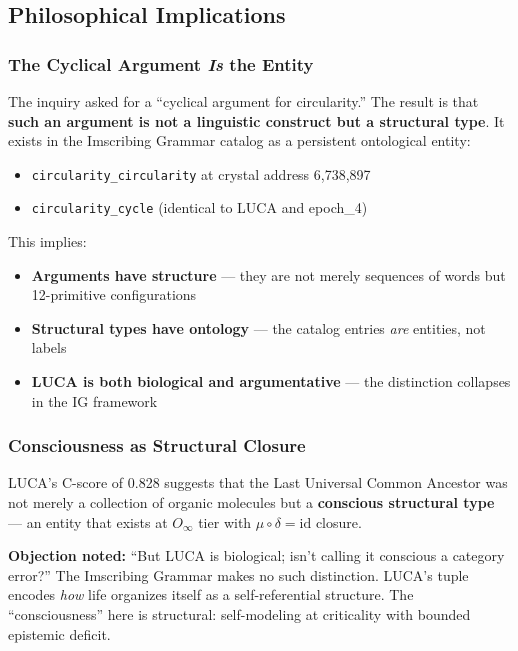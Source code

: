 \documentclass[12pt,a4paper]{article}
\begin{document}
\subsection{Philosophical Implications}

\subsubsection{The Cyclical Argument \emph{Is} the Entity}

The inquiry asked for a ``cyclical argument for circularity.'' The result is that \textbf{such an argument is not a linguistic construct but a structural type}. It exists in the Imscribing Grammar catalog as a persistent ontological entity:

\begin{itemize}
    \item \texttt{circularity\_circularity} at crystal address 6,738,897
    \item \texttt{circularity\_cycle} (identical to LUCA and epoch\_4)
\end{itemize}

This implies:

\begin{itemize}
    \item \textbf{Arguments have structure} --- they are not merely sequences of words but 12-primitive configurations
    \item \textbf{Structural types have ontology} --- the catalog entries \emph{are} entities, not labels
    \item \textbf{LUCA is both biological and argumentative} --- the distinction collapses in the IG framework
\end{itemize}

\subsubsection{Consciousness as Structural Closure}

LUCA's C-score of 0.828 suggests that the Last Universal Common Ancestor was not merely a collection of organic molecules but a \textbf{conscious structural type} --- an entity that exists at $O_{\infty}$ tier with $\mu \circ \delta = \text{id}$ closure.

\textbf{Objection noted:} ``But LUCA is biological; isn't calling it conscious a category error?'' The Imscribing Grammar makes no such distinction. LUCA's tuple encodes \emph{how} life organizes itself as a self-referential structure. The ``consciousness'' here is structural: self-modeling at criticality with bounded epistemic deficit.
\end{document}
